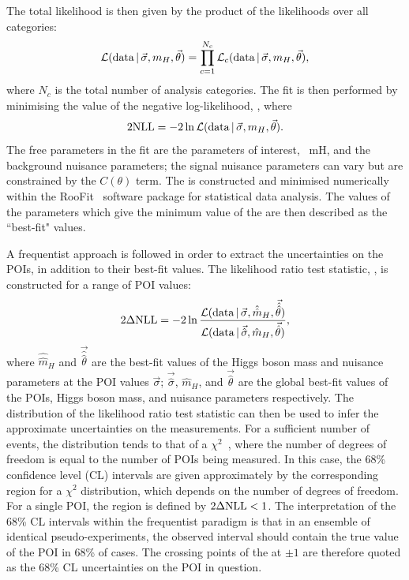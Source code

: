 The total likelihood \Like is then given by the product of the likelihoods over all categories:
\begin{equation}
\mathcal{L}(\textrm{data}\,|\,\vec{\sigma},m_{H},\vec{\theta}) = \prod^{N_c}_{c=1} \mathcal{L}_c(\textrm{data}\,|\,\vec{\sigma},m_{H},\vec{\theta}),
\end{equation}
where $N_c$ is the total number of analysis categories.
The fit is then performed by minimising the value of the negative log-likelihood, \NLL, where
\begin{equation}
2\textrm{NLL} = -2\ln\mathcal{L}(\textrm{data}\,|\,\vec{\sigma},m_{H},\vec{\theta}).
\end{equation}
The free parameters in the fit are the parameters of interest, \
mH, and the background nuisance parameters;
the signal nuisance parameters can vary but are constrained by the $C(\theta)$ term.
The \NLL is constructed and minimised numerically within the RooFit~\cite{RooFit} 
software package for statistical data analysis.
The values of the parameters which give the minimum value of the \NLL
are then described as the ``best-fit" values.

A frequentist approach is followed in order to extract the uncertainties on the POIs, 
in addition to their best-fit values.
The likelihood ratio test statistic, \dNLL, is constructed for a range of POI values:
\begin{equation}
2\Delta\textrm{NLL} = -2\ln\frac{ \mathcal{L}(\textrm{data}\,|\,\vec{\sigma},\hat{\hat{m}}_H,\vec{\hat{\hat{\theta}}}) }
                  { \mathcal{L}(\textrm{data}\,|\,\vec{\hat{\sigma}},\hat{m}_H,\vec{\hat{\theta}}) },
\end{equation}
where $\hat{\hat{m}}_H$ and $\vec{\hat{\hat{\theta}}}$ are the best-fit values 
of the Higgs boson mass and nuisance parameters at the POI values $\vec{\sigma}$;
$\vec{\hat{\sigma}}$, $\hat{m}_H$, and $\vec{\hat{\theta}}$ are the global best-fit values 
of the POIs, Higgs boson mass, and nuisance parameters respectively.
The distribution of the likelihood ratio test statistic 
can then be used to infer the approximate uncertainties on the measurements.
For a sufficient number of events, %
the distribution tends to that of a $\chi^2$~\cite{Asymptotic}, 
where the number of degrees of freedom is equal to the number of POIs being measured.
In this case, the 68\% confidence level (CL) intervals 
are given approximately by the corresponding region for a $\chi^2$ distribution, 
which depends on the number of degrees of freedom.
For a single POI, the region is defined by $2\Delta\textrm{NLL} < 1$.
The interpretation of the 68\% CL intervals within the frequentist paradigm 
is that in an ensemble of identical pseudo-experiments, 
the observed interval should contain the true value of the POI in 68\% of cases.
The crossing points of the \dNLL at $\pm 1$ are therefore quoted
as the 68\% CL uncertainties on the POI in question.

